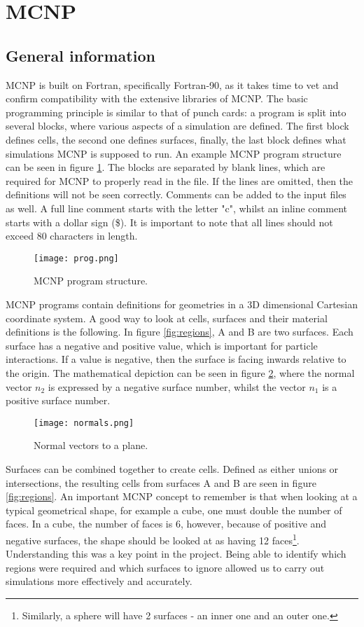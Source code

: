 \label{sec:mcnp}
\section{MCNP}
\subsection{General information}
MCNP is built on Fortran, specifically Fortran-90, as it takes time to vet and confirm compatibility with the extensive libraries of MCNP. The basic programming principle is similar to that of punch cards: a program is split into several blocks, where various aspects of a simulation are defined. The first block defines cells, the second one defines surfaces, finally, the last block defines what simulations MCNP is supposed to run. An example MCNP program structure can be seen in figure \ref{fig:program}. The blocks are separated by blank lines, which are required for MCNP to properly read in the file. If the lines are omitted, then the definitions will not be seen correctly. Comments can be added to the input files as well. A full line comment starts with the letter "c", whilst an inline comment starts with a dollar sign (\$). It is important to note that all lines should not exceed 80 characters in length.

\begin{figure}[!htbp]
\caption{MCNP program structure.}
\label{fig:program}
\centering
\texttt{[image: prog.png]}
\end{figure}

MCNP programs contain definitions for geometries in a 3D dimensional Cartesian coordinate system. A good way to look at cells, surfaces and their material definitions is the following. In figure \ref{fig:regions}, A and B are two surfaces. Each surface has a negative and positive value, which is important for particle interactions. If a value is negative, then the surface is facing inwards relative to the origin. The mathematical depiction can be seen in figure \ref{fig:planes}, where the normal vector $n_2$ is expressed by a negative surface number, whilst the vector $n_1$ is a positive surface number.

\begin{figure}[!htbp]
\caption{Normal vectors to a plane.}
\label{fig:planes}
\centering
\texttt{[image: normals.png]}
\end{figure}

Surfaces can be combined together to create cells. Defined as either unions or intersections, the resulting cells from surfaces A and B are seen in figure \ref{fig:regions}. An important MCNP concept to remember is that when looking at a typical geometrical shape, for example a cube, one must double the number of faces. In a cube, the number of faces is 6, however, because of positive and negative surfaces, the shape should be looked at as having 12 faces\footnote{Similarly, a sphere will have 2 surfaces - an inner one and an outer one.}. Understanding this was a key point in the project. Being able to identify which regions were required and which surfaces to ignore allowed us to carry out simulations more effectively and accurately.

